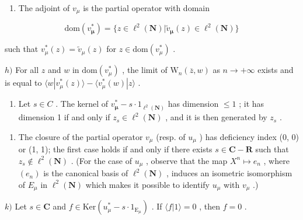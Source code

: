 \begin{enumerate}
\def\labelenumi{\alph{enumi})}
\setcounter{enumi}{6}
\tightlist
\item
  The adjoint of \(v_{\mu}\) is the partial operator with domain
\end{enumerate}

\[
\mathrm{dom} (v _ {\boldsymbol {\mu}} ^ {*}) = \{z \in \ell^ {2} (\mathbf {N}) | \widetilde {v} _ {\boldsymbol {\mu}} (z) \in \ell^ {2} (\mathbf {N}) \}
\]

such that \(v_{\mu}^{*}(z) = \widetilde{v}_{\mu}(z)\) for \(z \in \mathrm{dom}(v_{\mu}^{*})\) .

\(h)\) For all \(z\) and \(w\) in \(\mathrm{dom}(v_{\mu}^{*})\) , the limit of \(\mathrm{W}_{n}(\overline{z}, w)\) as \(n \to +\infty\) exists and is equal to \(\langle w | v_{\mu}^{*}(z) \rangle - \langle v_{\mu}^{*}(w) | z \rangle\) .

\begin{enumerate}
\def\labelenumi{\roman{enumi})}
\tightlist
\item
  Let \(s \in C\) . The kernel of \(v_{\boldsymbol{\mu}}^{*} - s \cdot 1_{\ell^{2}(\mathbf{N})}\) has dimension \(\leqslant 1\) ; it has dimension 1 if and only if \(z_{s} \in \ell^{2}(\mathbf{N})\) , and it is then generated by \(z_{s}\) .
\end{enumerate}

\begin{enumerate}
\def\labelenumi{\alph{enumi})}
\setcounter{enumi}{9}
\tightlist
\item
  The closure of the partial operator \(v_{\mu}\) (resp. of \(u_{\mu}\) ) has deficiency index (0, 0) or (1, 1); the first case holds if and only if there exists \(s \in \mathbf{C} - \mathbf{R}\) such that \(z_s \notin \ell^2(\mathbf{N})\) . (For the case of \(u_{\mu}\) , observe that the map \(X^n \mapsto e_n\) , where \((e_n)\) is the canonical basis of \(\ell^2(\mathbf{N})\) , induces an isometric isomorphism of \(E_{\mu}\) in \(\ell^2(\mathbf{N})\) which makes it possible to identify \(u_{\mu}\) with \(v_{\mu}\) .)
\end{enumerate}

\(k)\) Let \(s \in \mathbf{C}\) and \(f \in \mathrm{Ker}(u_{\mu}^{*} - s \cdot 1_{\mathrm{E}_{\mu}})\) . If \(\langle f | 1 \rangle = 0\) , then \(f = 0\) .

